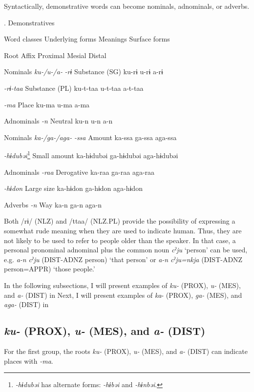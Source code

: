 Syntactically, demonstrative words can become nominals, adnominals, or adverbs.

\begin{styleBeschriftung}
\textmd{}\textmd{. Demonstratives}
\end{styleBeschriftung}

Word classes    Underlying forms  Meanings    Surface forms

    Root  Affix      Proximal  Mesial  Distal

Nominals    \textit{ku-/u-/a-}  \textit{{}-rɨ} Substance (SG)    ku-rɨ  u-rɨ  a-rɨ

      \textit{{}-rɨ-taa} Substance (PL)    ku-t-taa  u-t-taa  a-t-taa

      \textit{{}-ma} Place    ku-ma  u-ma  a-ma

Adnominals      \textit{{}-n} Neutral    ku-n  u-n  a-n

Nominals    \textit{ka-/ga-/aga-}  \textit{{}-ssa} Amount    ka-ssa  ga-ssa  aga-ssa

      \textit{{}-hɨdubəi}\footnote{\textit{{}-hɨdubəi} has alternate forms: \textit{{}-hɨbəi} and \textit{{}-hɨnbəi}.}  Small amount    ka-hɨdubəi  ga-hɨdubəi  aga-hɨdubəi

Adnominals      \textit{{}-raa} Derogative    ka-raa  ga-raa  aga-raa

      \textit{{}-hɨdon} Large size    ka-hɨdon  ga-hɨdon  aga-hɨdon

Adverbs      \textit{{}-n} Way    ka-n  ga-n  aga-n

Both /rɨ/ (NLZ) and /ttaa/ (NLZ.PL) provide the possibility of expressing a somewhat rude meaning when they are used to indicate human. Thus, they are not likely to be used to refer to people older than the speaker. In that case, a personal pronominal adnominal plus the common noun \textit{cˀju} ‘person’ can be used, e.g. \textit{a-n} \textit{cˀju} (DIST-ADNZ person) ‘that person’ or \textit{a-n} \textit{cˀju=nkja} (DIST-ADNZ person=APPR) ‘those people.’

In the following subsections, I will present examples of \textit{ku-} (PROX), \textit{u-} (MES), and \textit{a-} (DIST) in  Next, I will present examples of \textit{ka}{}- (PROX), \textit{ga-} (MES), and \textit{aga-} (DIST) in 

\subsection{\textit{ku-} (PROX), \textit{u-} (MES), and \textit{a-} (DIST)}
\label{bkm:Ref361694047}
For the first group, the roots \textit{ku-} (PROX), \textit{u-} (MES), and \textit{a-} (DIST) can indicate places with \textit{{}-ma}.

